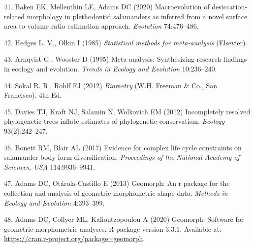 \documentclass[9pt,twocolumn,twoside,lineno]{pnas-new}
\begin{document}
\leavevmode\hypertarget{ref-Baken2020}{}%
41. Baken EK, Mellenthin LE, Adams DC (2020) Macroevolution of
desiccation‐related morphology in plethodontid salamanders as inferred
from a novel surface area to volume ratio estimation approach.
\emph{Evolution} 74:476--486.

\leavevmode\hypertarget{ref-HedgesOlkin1985}{}%
42. Hedges L. V., Olkin I (1985) \emph{Statistical methods for
meta-analysis} (Elsevier).

\leavevmode\hypertarget{ref-Arnqvist1995}{}%
43. Arnqvist G., Wooster D (1995) Meta-analysis: Synthesizing research
findings in ecology and evolution. \emph{Trends in Ecology and
Evolution} 10:236--240.

\leavevmode\hypertarget{ref-SokalRohlf2012}{}%
44. Sokal R. R., Rohlf FJ (2012) \emph{Biometry} (W.H. Freeman \& Co.,
San Francisco). 4th Ed.

\leavevmode\hypertarget{ref-Davies2012}{}%
45. Davies TJ, Kraft NJ, Salamin N, Wolkovich EM (2012) Incompletely
resolved phylogenetic trees inflate estimates of phylogenetic
conservatism. \emph{Ecology} 93(2):242--247.

\leavevmode\hypertarget{ref-Bonett2017}{}%
46. Bonett RM, Blair AL (2017) Evidence for complex life cycle
constraints on salamander body form diversification. \emph{Proceedings
of the National Academy of Sciences, USA} 114:9936--9941.

\leavevmode\hypertarget{ref-AdamsOtarola2013}{}%
47. Adams DC, Otárola-Castillo E (2013) Geomorph: An r package for the
collection and analysis of geometric morphometric shape data.
\emph{Methods in Ecology and Evolution} 4:393--399.

\leavevmode\hypertarget{ref-AdamsGeomorph}{}%
48. Adams DC, Collyer ML, Kaliontzopoulou A (2020) Geomorph: Software
for geometric morphometric analyses. R package version 3.3.1. Available
at: \url{https://cran.r-project.org/package=geomorph}.



% 
\end{document}

